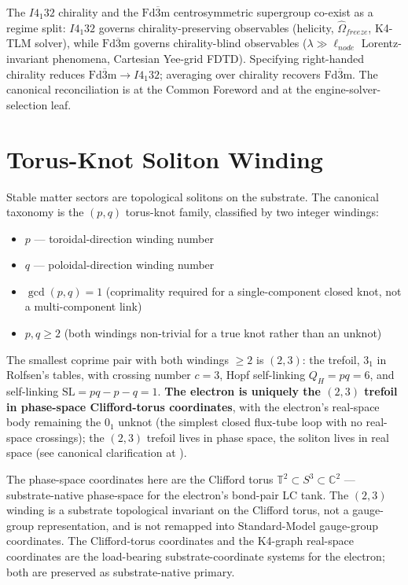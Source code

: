 

The $I4_1 32$ chirality and the $\text{Fd}\overline{3}\text{m}$ centrosymmetric supergroup co-exist as a regime split: $I4_1 32$ governs chirality-preserving observables (helicity, $\hat{\Omega}_{freeze}$, K4-TLM solver), while $\text{Fd}\overline{3}\text{m}$ governs chirality-blind observables ($\lambda \gg \ell_{node}$ Lorentz-invariant phenomena, Cartesian Yee-grid FDTD). Specifying right-handed chirality reduces $\text{Fd}\overline{3}\text{m} \to I4_1 32$; averaging over chirality recovers $\text{Fd}\overline{3}\text{m}$. The canonical reconciliation is at the Common Foreword and at the engine-solver-selection leaf.

\section{Torus-Knot Soliton Winding}
\label{sec:vol9_torus_knot_winding}

Stable matter sectors are topological solitons on the substrate. The canonical taxonomy is the $(p, q)$ torus-knot family, classified by two integer windings:

\begin{itemize}
    \item $p$ --- toroidal-direction winding number
    \item $q$ --- poloidal-direction winding number
    \item $\gcd(p, q) = 1$ (coprimality required for a single-component closed knot, not a multi-component link)
    \item $p, q \geq 2$ (both windings non-trivial for a true knot rather than an unknot)
\end{itemize}

The smallest coprime pair with both windings $\geq 2$ is $(2, 3)$: the trefoil, $3_1$ in Rolfsen's tables, with crossing number $c = 3$, Hopf self-linking $Q_H = p q = 6$, and self-linking $\text{SL} = pq - p - q = 1$. \textbf{The electron is uniquely the $(2, 3)$ trefoil in phase-space Clifford-torus coordinates}, with the electron's real-space body remaining the $0_1$ unknot (the simplest closed flux-tube loop with no real-space crossings); the $(2, 3)$ trefoil lives in phase space, the soliton lives in real space (see canonical clarification at ).

The phase-space coordinates here are the Clifford torus $\mathbb{T}^2 \subset S^3 \subset \mathbb{C}^2$ --- substrate-native phase-space for the electron's bond-pair LC tank. The $(2, 3)$ winding is a substrate topological invariant on the Clifford torus, not a gauge-group representation, and is not remapped into Standard-Model gauge-group coordinates. The Clifford-torus coordinates and the K4-graph real-space coordinates are the load-bearing substrate-coordinate systems for the electron; both are preserved as substrate-native primary.

